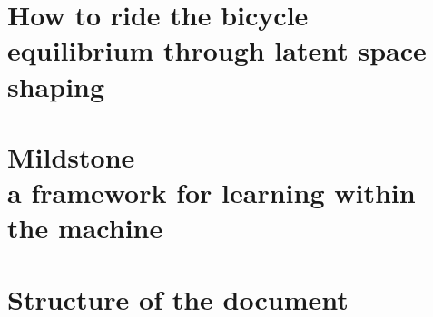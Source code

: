 






\section{How to ride the bicycle \\ \small{ equilibrium through latent space shaping }}
\cite{rideabike_nature_2016}


\section{Mildstone \\ \small{ a framework for learning within the machine }}

\section{Structure of the document}